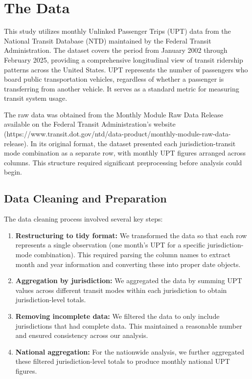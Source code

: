 \documentclass[11pt]{article}
\begin{document}
\section{The Data}

This study utilizes monthly Unlinked Passenger Trips (UPT) data from the National Transit Database (NTD) maintained by the Federal Transit Administration. The dataset covers the period from January 2002 through February 2025, providing a comprehensive longitudinal view of transit ridership patterns across the United States. UPT represents the number of passengers who board public transportation vehicles, regardless of whether a passenger is transferring from another vehicle. It serves as a standard metric for measuring transit system usage.

The raw data was obtained from the Monthly Module Raw Data Release available on the Federal Transit Administration's website (https://www.transit.dot.gov/ntd/data-product/monthly-module-raw-data-release). In its original format, the dataset presented each jurisdiction-transit mode combination as a separate row, with monthly UPT figures arranged across columns. This structure required significant preprocessing before analysis could begin.

\subsection{Data Cleaning and Preparation}

The data cleaning process involved several key steps:

\begin{enumerate}
  \item \textbf{Restructuring to tidy format:} We transformed the data so that each row represents a single observation (one month's UPT for a specific jurisdiction-mode combination). This required parsing the column names to extract month and year information and converting these into proper date objects.
  
  \item \textbf{Aggregation by jurisdiction:} We aggregated the data by summing UPT values across different transit modes within each jurisdiction to obtain jurisdiction-level totals.
  
  \item \textbf{Removing incomplete data:} We filtered the data to only include jurisdictions that had complete data. This maintained a reasonable number and ensured consistency across our analysis.
  
  \item \textbf{National aggregation:} For the nationwide analysis, we further aggregated these filtered jurisdiction-level totals to produce monthly national UPT figures.
\end{enumerate}
\end{document}
